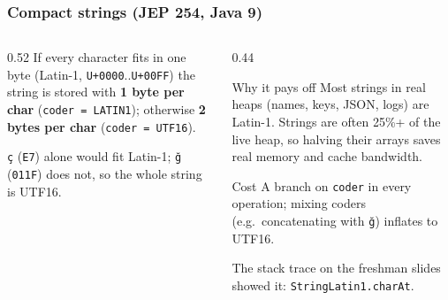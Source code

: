 \documentclass[aspectratio=169,10pt,compress]{beamer}
\begin{document}
\begin{frame}[t,fragile] \frametitle{Compact strings (JEP 254, Java 9)}
  \begin{columns}[T]
    \begin{column}{0.52\textwidth}
      \small If every character fits in one byte (Latin-1, \texttt{U+0000}..\texttt{U+00FF}) the string is stored
      with \textbf{1 byte per char} (\texttt{coder = LATIN1}); otherwise \textbf{2 bytes per char} (\texttt{coder = UTF16}).
      \vspace{0.4em}


      \vspace{0.3em}
      \small \texttt{ç} (\texttt{E7}) alone would fit Latin-1; \texttt{ğ} (\texttt{011F}) does not, so the whole string is UTF16.
    \end{column}
    \begin{column}{0.44\textwidth}
      \begin{block}{Why it pays off}
        \small Most strings in real heaps (names, keys, JSON, logs) are Latin-1. Strings are often 25\%+ of the live heap,
        so halving their arrays saves real memory and cache bandwidth.
      \end{block}
      \begin{block}{Cost}
        \small A branch on \texttt{coder} in every operation; mixing coders (e.g.\ concatenating with \texttt{ğ}) inflates to UTF16.
      \end{block}
      \small The stack trace on the freshman slides showed it: \texttt{StringLatin1.charAt}.
    \end{column}
  \end{columns}
\end{frame}
\end{document}

